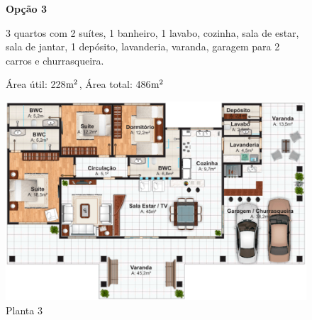 \begin{figure}
\textbf{Opção 3}

	3 quartos com 2 suítes, 1 banheiro, 1 lavabo, cozinha, sala de estar, sala de jantar, 1 depósito, lavanderia, varanda, garagem para 2 carros e churrasqueira.

Área útil: 228$\textup{m}^{2}$, Área total: 486$\textup{m}^{2}$
\begin{center}
\includegraphics[keepaspectratio,scale=0.5]{figuras/planta3.eps}
\caption{Planta 3\cite{planta3}}
\end{center}
\end{figure}
